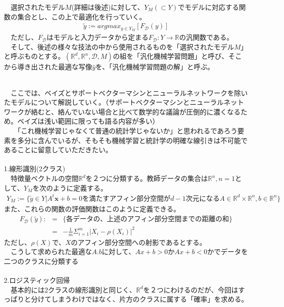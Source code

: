 \documentclass{jsarticle}
\begin{document}
　選択されたモデル$M$(詳細は後述)に対して、$Y_M(\subset Y)$でモデルに対応する関数の集合とし、この上で最適化を行っていく。\\
\begin{eqnarray}
\tilde{y}:=argmax_{y\in Y_M}[F_\mathcal{D}(y)]
\end{eqnarray}
　ただし、$F_\mathcal{D}$はモデルと入力データから定まる$F_\mathcal{D}:Y\rightarrow\mathbb{R}$の汎関数である。\\
　そして、後述の様々な技法の中から使用されるものを「選択されたモデル$M$」と呼ぶものとする。$(\mathbb{R}^d,\mathbb{R}^n,\mathcal{D},M)$の組を「汎化機械学習問題」と呼び、そこから導き出された最適な写像$\hat{y}$を、「汎化機械学習問題の解」と呼ぶ。

\newpage
\scalebox{1.1}{2.モデル設定}\\
　ここでは、ベイズとサポートベクターマシンとニューラルネットワークを除いたモデルについて解説していく。（サポートベクターマシンとニューラルネットワークが絡むと、絡んでいない場合と比べて数学的な議論が圧倒的に濃くなるため。ベイズは浅い範囲に限っても語る内容が多い）\\
　　「これ機械学習じゃなくて普通の統計学じゃないか」と思われるであろう要素を多分に含んでいるが、そもそも機械学習と統計学の明確な線引きは不可能であることに留意していただきたい。\\
　\\
1.線形識別(2クラス)\\
　特徴量ベクトルの空間$\mathbb{R}^d$を２つに分類する。教師データの集合は$\mathbb{R}^n,n=1$として、$Y_M$を次のように定義する。
\begin{eqnarray}
Y_M:=\{\tilde{y}\in Y|A^t\bm{x}+b=0を満たすアフィン部分空間がd-1次元になるA\in \mathbb{R}^d\times\mathbb{R}^n,b\in\mathbb{R}^n \}
\end{eqnarray}
また、これらの関数の評価関数はこのように定義できる。
\begin{eqnarray}
F_\mathcal{D}(\tilde{y}):&=&\{各データの、上述のアフィン部分空間までの距離の和\}\nonumber\\
&=&-\frac{1}{m}\Sigma_{i=1}^m |X_i-\rho(X_i)|^2
\end{eqnarray}
ただし、$\rho(X)$で、$X$のアフィン部分空間への射影であるとする。\\
　こうして求められた最適な$A.b$に対して、$Ax+b>0$か$Ax+b<0$かでデータを二つのクラスに分類する\\
　\\
2.ロジスティック回帰\\
　基本的には2クラスの線形識別と同じく、$\mathbb{R}^d$を２つにわけるのだが、今回はすっぱりと分けてしまうわけではなく、片方のクラスに属する「確率」を求める。\\
\end{document}
